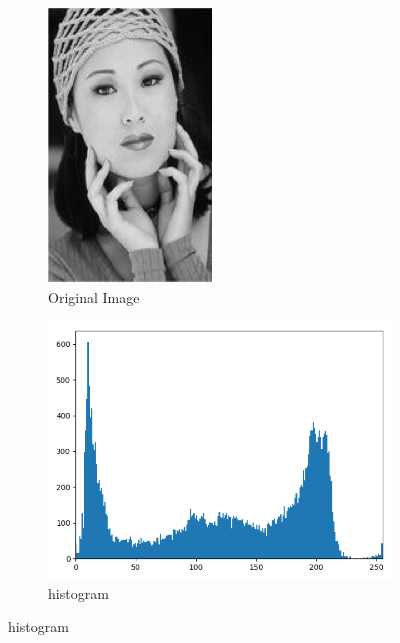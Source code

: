 \documentclass[conference]{IEEEtran}
\begin{document}

\begin{figure}
    \centering
    \begin{subfigure}{.5\linewidth}
      \centering
      \includegraphics[height=0.7\textwidth]{imgresults/face_original.png}
      \caption{Original Image}
      \label{fig:sub1}
    \end{subfigure}%
    \begin{subfigure}{.5\linewidth}
        \centering
        \includegraphics[width=1\textwidth]{imgresults/face_hist.png}
        \caption{histogram}
        \label{fig:histogram}
    \end{subfigure}
    \label{fig:sub}



\end{figure}
\end{document}
